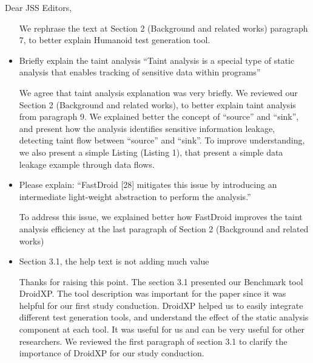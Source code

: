 \documentclass[12pt,english]{scrartcl}
\begin{document}
\begin{letter}{Dear JSS Editors,}
\begin{itemize}
\vspace{0.2cm}

{\color{blue}{\bf Answer.} We rephrase the text at Section 2 (Background and related works) paragraph 7, to better explain Humanoid test generation tool.}

\vspace{0.2cm}

\item Briefly explain the taint analysis
``Taint analysis is a special type of static analysis that enables tracking of sensitive data within programs''


\vspace{0.2cm}

{\color{blue}{\bf Answer.} We agree that taint analysis explanation was very briefly. We reviewed our Section 2 (Background and related works), to better explain taint analysis from paragraph 9. We explained better the concept of ``source'' and ``sink'', and present how the analysis identifies sensitive information leakage, detecting taint flow between “source” and “sink”. To improve understanding, we also present a simple Listing (Listing 1), that present a simple data leakage example through data flows. }


\vspace{0.2cm}

\item Please explain:
``FastDroid [28] mitigates this issue by introducing an intermediate light-weight abstraction to perform the analysis.''


\vspace{0.2cm}

{\color{blue}{\bf Answer.} To address this issue, we explained better how FastDroid improves the taint analysis efficiency at the last paragraph of Section 2 (Background and related works)}

\vspace{0.2cm}

\item Section 3.1, the help text is not adding much value

\vspace{0.2cm}

{\color{blue}{\bf Answer.} Thanks for raising this point. The section 3.1 presented our Benchmark tool DroidXP. The tool description was important for the paper since it was helpful for our first study conduction. DroidXP helped us to easily integrate different test generation tools, and understand the effect of the static analysis component at each tool. It was useful for us and can be very useful for other researchers. We
reviewed the first paragraph of section 3.1 to clarify the importance of DroidXP for our study conduction.}



\end{itemize}
\end{letter}
\end{document}

